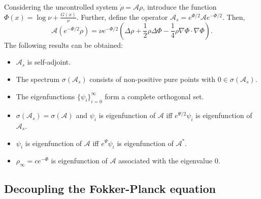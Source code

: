 \documentclass[12pt]{article}
\newcommand{\steady}{\rho_{\infty}}
\theoremstyle{definition}
\begin{document}
Considering the uncontrolled system $\dot{\rho} = \mathcal{A} \rho$, introduce the function $\Phi(x) = \log \nu + \frac{G(x)}{\nu}$.
Further, define the operator $\mathcal{A}_s = e^{\Phi/2}\mathcal{A}e^{-\Phi/2}$.
Then,
\[
\mathcal{A}\left(e^{-\Phi/2} \rho \right) = \nu e^{-\Phi/2}\left(\Delta \rho + \frac{1}{2}\rho\Delta \Phi - \frac{1}{4}\rho \nabla \Phi \cdot \nabla \Phi \right).
\]
The following results can be obtained:
\begin{itemize}
    \item $\mathcal{A}_s$ is self-adjoint.
    \item The spectrum $\sigma(\mathcal{A}_s)$ consists of non-positive pure points with $0 \in \sigma(\mathcal{A}_s)$.
    \item The eigenfunctions ${\{\psi_i\}}_{i=0}^{\infty}$ form a complete orthogonal set.
    \item $\sigma(\mathcal{A}_s) = \sigma(\mathcal{A})$ and $\psi_i$ is eigenfunction of $\mathcal{A}$ iff $e^{\Psi/2}\psi_i$ is eigenfunction of $\mathcal{A}_s$. 
    \item $\psi_i$ is eigenfunction of $\mathcal{A}$ iff $e^{\Psi}\psi_i$ is eigenfunction of $\mathcal{A}^*$. 
    \item $\steady = ce^{-\Phi}$ is eigenfunction of $\mathcal{A}$ associated with the eigenvalue $0$.
\end{itemize}

\subsection{Decoupling the Fokker-Planck equation}
\end{document}
